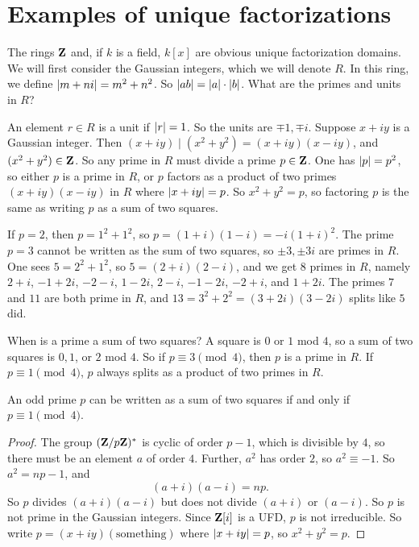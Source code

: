 \documentclass[11pt, oneside,margin=1in]{article}
\begin{document}
\section{Examples of unique factorizations}
The rings $\mathbf Z$ and, if $k$ is a field, $k[x]$ are obvious unique factorization domains. We will first consider the Gaussian integers, which we will denote $R$. In this ring, we define $\left \lvert m+ni \right \rvert = m^2 + n^2$. So $\left \lvert ab \right \rvert = \left \lvert a \right \rvert\cdot\left \lvert b \right \rvert$. What are the primes and units in $R$?

An element $r\in R$ is a unit if $\left \lvert r \right \rvert = 1$. So the units are $\mp1,\mp i$. Suppose $x+iy$ is a Gaussian integer. Then $(x+iy)\mid (x^2+y^2) = (x+iy)(x-iy)$, and $(x^2 + y^2) \in \mathbf Z$. So any prime in $R$ must divide a prime $p\in \mathbf Z$. One has $\left \lvert p \right \rvert = p^2$, so either $p$ is a prime in $R$, or $p$ factors as a product of two primes $(x+iy)(x-iy)$ in $R$ where $\left \lvert x+iy \right \rvert = p$. So $x^2 + y^2 = p$, so factoring $p$ is the same as writing $p$ as a sum of two squares. 

If $p=2$, then $p = 1^2 + 1^2$, so $p=(1+i)(1-i) = -i(1+i)^2$. The prime $p=3$ cannot be written as the sum of two squares, so $\pm3, \pm3i$ are primes in $R$. One sees $5 = 2^2 + 1^2$, so $5 = (2+i)(2-i)$, and we get $8$ primes in $R$, namely $2+i$, $-1 + 2i$, $-2-i$, $1-2i$, $2-i$, $-1-2i$, $-2+i$, and $1+2i$. The primes $7$ and $11$ are both prime in $R$, and $13 = 3^2 + 2^2=(3+2i)(3-2i)$ splits like $5$ did. 

When is a prime a sum of two squares? A square is $0$ or $1$ mod $4$, so a sum of two squares is $0,1$, or $2$ mod $4$. So if $p\equiv 3\pmod 4$, then $p$ is a prime in $R$. If $p\equiv 1\pmod 4$, $p$ always splits as a product of two primes in $R$. 
\begin{proposition}[Fermat]
An odd prime $p$ can be written as a sum of two squares if and only if $p\equiv 1\pmod 4$.
\end{proposition}
\begin{proof}
The group $(\mathbf Z / p\mathbf Z)^*$ is cyclic of order $p-1$, which is divisible by $4$, so there must be an element $a$ of order $4$. Further, $a^2$ has order $2$, so $a^2\equiv -1$. So $a^2 = np-1$, and 
$$
(a+i)(a-i) = np.
$$
So $p$ divides $(a+i)(a-i)$ but does not divide $(a+i)$ or $(a-i)$. So $p$ is not prime in the Gaussian integers. Since $\mathbf Z[i]$ is a UFD, $p$ is not irreducible. So write $p=(x+iy)(\textrm{something})$ where $\left \lvert x+iy \right \rvert = p$, so $x^2 + y^2= p$.
\end{proof}
\end{document}

